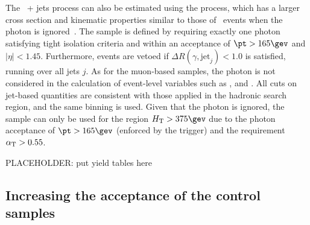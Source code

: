 The \znunu\ + jets process can also be estimated using the \gj
process, which has a larger cross section and kinematic properties
similar to those of \znunu\ events when the photon is
ignored~\cite{PAS-SUS-08-002,Bern:2011pa}. The \gj sample is defined
by requiring exactly one photon satisfying tight isolation criteria
and within an acceptance of $\pt > 165\gev$ and $|\eta| <
1.45$. Furthermore, events are vetoed if $\Delta
R(\gamma,\textrm{jet}_j) < 1.0$ is satisfied, running over all jets
$j$. As for the muon-based samples, the photon is not considered in
the calculation of event-level variables such as \scalht, \mht and
\alphat. All cuts on jet-based quantities are consistent with those
applied in the hadronic search region, and the same \HT binning is
used. Given that the photon is ignored, the \gj sample can only be
used for the region $\scalht > 375\gev$ due to the photon acceptance
of $\pt > 165\gev$ (enforced by the trigger) and the requirement
$\alpha_{\text{T}} > 0.55$.

PLACEHOLDER: put yield tables here 

\subsection{Increasing the acceptance of the control samples\label{sec:larger}}


